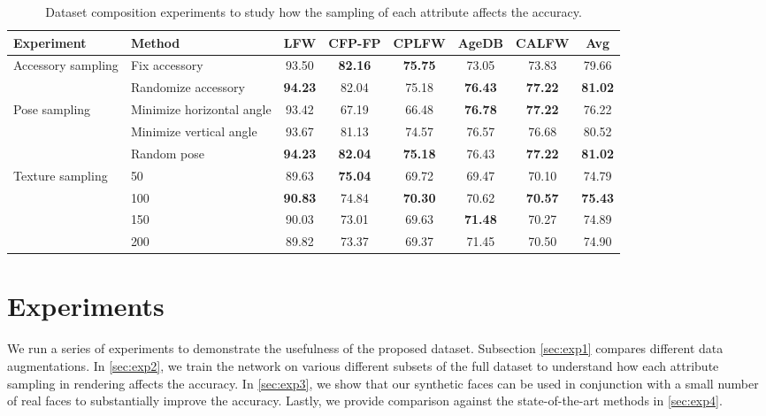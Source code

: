 \documentclass[10pt,twocolumn,letterpaper]{article}
\begin{document}
\begin{table*}[t]
\footnotesize
\setlength{\tabcolsep}{3.0pt}
\begin{center}
\begin{tabular}{l|l|ccccc|c}
\toprule
Experiment & Method & LFW & CFP-FP & CPLFW & AgeDB & CALFW & Avg \\
\midrule
\multirow{2}{*}{Accessory sampling}
& Fix accessory & 93.50 & \textbf{82.16} & \textbf{75.75} & 73.05 & 73.83 & 79.66 \\
& Randomize accessory & \textbf{94.23} & 82.04 & 75.18 & \textbf{76.43} & \textbf{77.22} & \textbf{81.02} \\
\midrule
\multirow{3}{*}{Pose sampling}
& Minimize horizontal angle
& 93.42 & 67.19 & 66.48 & \textbf{76.78} & \textbf{77.22} & 76.22 \\
& Minimize vertical angle 
& 93.67 & 81.13 & 74.57 & 76.57 & 76.68 & 80.52 \\
& Random pose
& \textbf{94.23} & \textbf{82.04} & \textbf{75.18} & 76.43 & \textbf{77.22} & \textbf{81.02} \\
\midrule
\multirow{3}{*}{Texture sampling}
& 50
& 89.63 & \textbf{75.04} & 69.72 & 69.47 & 70.10 & 74.79 \\
\multirow{3}{*}{\footnotesize (\# textures to select from)}
& 100
& \textbf{90.83} & 74.84 & \textbf{70.30} & 70.62 & \textbf{70.57} & \textbf{75.43} \\
& 150
& 90.03 & 73.01 & 69.63 & \textbf{71.48} & 70.27 & 74.89 \\
& 200
& 89.82 & 73.37 & 69.37 & 71.45 & 70.50 & 74.90 \\
\bottomrule
\end{tabular}
\end{center}
\caption{Dataset composition experiments to study how the sampling of each attribute affects the accuracy.}
\label{table:data_composition}
\end{table*}






\section{Experiments}
\label{sec:exp}

We run a series of experiments to demonstrate the usefulness of the proposed dataset. 
Subsection \ref{sec:exp1} compares different data augmentations. 
In \autoref{sec:exp2}, we train the network on various different subsets of the full dataset to understand how each attribute sampling in rendering affects the accuracy. 
In \autoref{sec:exp3}, we show that our synthetic faces can be used in conjunction with a small number of real faces to substantially improve the accuracy. 
Lastly, we provide comparison against the state-of-the-art methods in \autoref{sec:exp4}.
\end{document}
